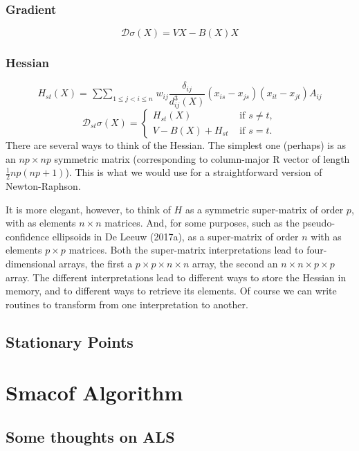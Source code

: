 \documentclass[
  12pt,
]{article}
\newcommand{\jis}{\mathop{\sum\sum}_{1\leq j<i\leq n}}
\begin{document}
\subsubsection{Gradient}\label{gradient}

\[
\mathcal{D}\sigma(X)=VX-B(X)X
\]

\subsubsection{Hessian}\label{hessian}

\[
H_{st}(X)=\jis w_{ij}\frac{\delta_{ij}}{d_{ij}^3(X)}(x_{is}-x_{js})(x_{it}-x_{jt})A_{ij}
\]
\[
\mathcal{D}_{st}\sigma(X)=\begin{cases}H_{st}(X)&\text{ if }s\not= t,\\
V-B(X)+H_{st}&\text{ if }s= t.
\end{cases}
\]
There are several ways to think of the Hessian. The simplest one
(perhaps) is as an \(np\times np\) symmetric matrix (corresponding to
column-major R vector of length \(\frac12 np(np+1)\)). This is what we
would use for a straightforward version of Newton-Raphson.

It is more elegant, however, to think of \(H\) as a symmetric super-matrix
of order \(p\), with as elements \(n\times n\) matrices. And, for some
purposes, such as the pseudo-confidence ellipsoids in De Leeuw (2017a), as
a super-matrix of order \(n\) with as elements \(p\times p\) matrices. Both
the super-matrix interpretations lead to four-dimensional arrays, the
first a \(p\times p\times n\times n\) array, the second an
\(n\times n\times p\times p\) array. The different interpretations lead to
different ways to store the Hessian in memory, and to different ways to
retrieve its elements. Of course we can write routines to transform from
one interpretation to another.

\subsection{Stationary Points}\label{stationary-points}

\section{Smacof Algorithm}\label{smacof-algorithm}

\subsection{Some thoughts on ALS}\label{some-thoughts-on-als}
\end{document}
